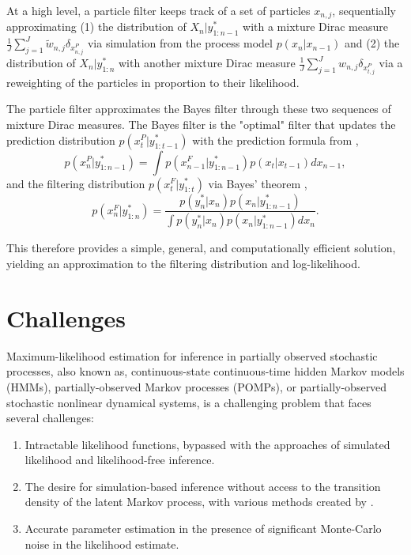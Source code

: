 \documentclass{article}
\begin{document}
At a high level, a particle filter keeps track of a set of particles $x_{n,j}$, sequentially approximating (1) the distribution of $X_{n}|y_{1:n-1}^*$ with a mixture Dirac measure $\frac{1}{J}\sum_{j=1}^J \tilde{w}_{n,j}\delta_{x_{n,j}^P}$ via simulation from the process model $p(x_n|x_{n-1})$ and (2) the distribution of $X_{n}|y_{1:n}^*$ with another mixture Dirac measure $\frac{1}{J}\sum_{j=1}^J w_{n,j}\delta_{x_{t,j}^P}$ via a reweighting of the particles in proportion to their likelihood. 

The particle filter approximates the Bayes filter through these two sequences of mixture Dirac measures. The Bayes filter is the "optimal" filter that updates the prediction distribution $p(x_{t}^P|y_{1:t-1}^*)$ with the prediction formula from \cite{sbied_lec3}, 
\begin{equation}
    p(x_{n}^P|y_{1:n-1}^*) = \int p(x_{n-1}^F|y_{1:n-1}^*)p(x_t|x_{t-1}) dx_{n-1},
\end{equation}
and the filtering distribution $p(x_t^F|y_{1:t}^*)$ via Bayes' theorem \citep{sbied_lec3},
\begin{equation}
    p(x_n^F|y_{1:n}^*) = \frac{p(y_n^*|x_n)p(x_n|y_{1:n-1}^*)}{\int p(y_n^*|x_n)p(x_n|y_{1:n-1}^*) dx_n}.
\end{equation}

This therefore provides a simple, general, and computationally efficient solution, yielding an approximation to the filtering distribution and log-likelihood. 


\section{Challenges}



Maximum-likelihood estimation for inference in partially observed stochastic processes, also known as, continuous-state continuous-time hidden Markov models (HMMs), partially-observed Markov processes (POMPs), or partially-observed stochastic nonlinear dynamical systems, is a challenging problem that faces several challenges: 
\begin{enumerate}
    \item Intractable likelihood functions, bypassed with the approaches of simulated likelihood and likelihood-free inference. 
    \item The desire for simulation-based inference without access to the transition density of the latent Markov process, with various methods created by \cite{welch2009abc, wood2010sl, doucet2010pmcmc, ionides08, ionides15}. 
    \item Accurate parameter estimation in the presence of significant Monte-Carlo noise in the likelihood estimate.
\end{enumerate}
\end{document}
